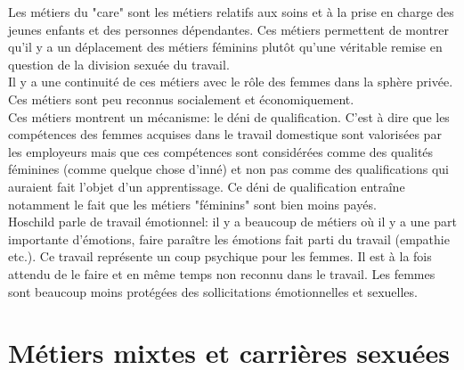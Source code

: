 \documentclass[12pt, a4paper, openany]{book}
\begin{document}
Les métiers du "care" sont les métiers relatifs aux soins et à la prise en charge des jeunes enfants et des personnes dépendantes. Ces métiers permettent de montrer qu'il y a un déplacement des métiers féminins plutôt qu'une véritable remise en question de la division sexuée du travail. \\
Il y a une continuité de ces métiers avec le rôle des femmes dans la sphère privée. Ces métiers sont peu reconnus socialement et économiquement. \\
Ces métiers montrent un mécanisme: le déni de qualification. C'est à dire que les compétences des femmes acquises dans le travail domestique sont valorisées par les employeurs mais que ces compétences sont considérées comme des qualités féminines (comme quelque chose d'inné) et non pas comme des qualifications qui auraient fait l'objet d'un apprentissage. Ce déni de qualification entraîne notamment le fait que les métiers "féminins" sont bien moins payés. \\
Hoschild parle de travail émotionnel: il y a beaucoup de métiers où il y a une part importante d'émotions, faire paraître les émotions fait parti du travail (empathie etc.). Ce travail représente un coup psychique pour les femmes. Il est à la fois attendu de le faire et en même temps non reconnu dans le travail. Les femmes sont beaucoup moins protégées des sollicitations émotionnelles et sexuelles. 


\section{Métiers mixtes et carrières sexuées}
\end{document}
